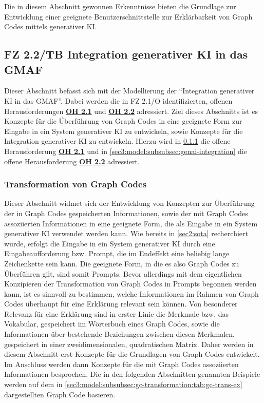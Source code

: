 Die in diesem Abschnitt gewonnen Erkenntnisse bieten die Grundlage zur Entwicklung einer geeignete Benutzerschnittstelle zur Erklärbarkeit von Graph Codes mittels generativer KI.

\clearpage

\subsection{FZ 2.2/TB Integration generativer KI in das GMAF}
\label{sec3:model:subsec:fz-integration}
Dieser Abschnitt befasst sich mit der Modellierung der \enquote{Integration generativer KI in das GMAF}. Dabei werden die in FZ 2.1/O identifizierten, offenen Herausforderungen \hyperref[sec2:sota:oi:2.1]{\textbf{OH 2.1}} und \hyperref[sec2:sota:oi:2.2]{\textbf{OH 2.2}} adressiert.
Ziel dieses Abschnitts ist es Konzepte für die Überführung von Graph Codes in eine geeignete Form zur Eingabe in ein System generativer KI zu entwickeln, sowie Konzepte für die Integration generativer KI zu entwickeln.
Hierzu wird in \cref{sec3:model:subsubsec:gc-transformation} die offene Herausforderung \hyperref[sec2:sota:oi:2.1]{\textbf{OH 2.1}} und in \cref{sec3:model:subsubsec:genai-integration} die offene Herausforderung \hyperref[sec2:sota:oi:2.2]{\textbf{OH 2.2}} adressiert.

\subsubsection{Transformation von Graph Codes}
\label{sec3:model:subsubsec:gc-transformation}
Dieser Abschnitt widmet sich der Entwicklung von Konzepten zur Überführung der in Graph Codes gespeicherten Informationen, sowie der mit Graph Codes assoziierten Informationen in eine geeignete Form, die als Eingabe in ein System generativer KI verwendet werden kann.
Wie bereits in \cref{sec2:sota} recherchiert wurde, erfolgt die Eingabe in ein System generativer KI durch eine Eingabeaufforderung bzw. Prompt, die im Endeffekt eine beliebig lange Zeichenkette sein kann.
Die geeignete Form, in die es also Graph Codes zu Überführen gilt, sind somit Prompts.
Bevor allerdings mit dem eigentlichen Konzipieren der Transformation von Graph Codes in Prompts begonnen werden kann, ist es sinnvoll zu bestimmen, welche Informationen im Rahmen von Graph Codes überhaupt für eine Erklärung relevant sein können.
Von besonderer Relevanz für eine Erklärung sind in erster Linie die Merkmale bzw. das Vokabular, gespeichert im Wörterbuch eines Graph Codes, sowie die Informationen über bestehende Beziehungen zwischen diesen Merkmalen, gespeichert in einer zweidimensionalen, quadratischen Matrix.
Daher werden in diesem Abschnitt erst Konzepte für die Grundlagen von Graph Codes entwickelt.
Im Anschluss werden dann Konzepte für die mit Graph Codes assoziierten Informationen besprochen.
Die in den folgenden Abschnitten genannten Beispiele werden auf dem in \cref{sec3:model:subsubsec:gc-transformation:tab:gc-trans-ex} dargestellten Graph Code basieren.


